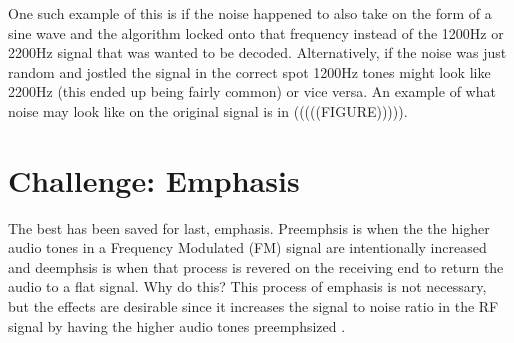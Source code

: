 One such example of this is if the noise happened to also take on the form of a sine wave and the algorithm locked onto that frequency instead of the 1200Hz or 2200Hz signal that was wanted to be decoded. Alternatively, if the noise was just random and jostled the signal in the correct spot 1200Hz tones might look like 2200Hz (this ended up being fairly common) or vice versa. An example of what noise may look like on the original signal is in (((((FIGURE))))).


\section{Challenge: Emphasis}
The best has been saved for last, emphasis. Preemphsis is when the the higher audio tones in a Frequency Modulated (FM) signal are intentionally increased and deemphsis is when that process is revered on the receiving end to return the audio to a flat signal. Why do this? This process of emphasis is not necessary, but the effects are desirable since it increases the signal to noise ratio in the RF signal by having the higher audio tones preemphsized \cite{Gibilisco1994}. 
